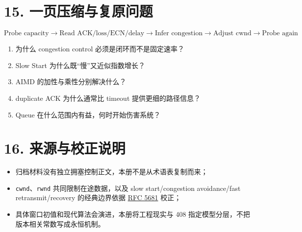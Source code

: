 \documentclass[UTF8,fontset=none,11pt,a4paper]{ctexart}
\providecommand{\tightlist}{\setlength{\itemsep}{0pt}\setlength{\parskip}{0pt}}
\providecommand{\passthrough}[1]{#1}
\begin{document}
\section{15.
一页压缩与复原问题}\label{15-ux4e00ux9875ux538bux7f29ux4e0eux590dux539fux95eeux9898}

\[
\boxed{
\text{Probe capacity}
\to \text{Read ACK/loss/ECN/delay}
\to \text{Infer congestion}
\to \text{Adjust cwnd}
\to \text{Probe again}
}
\]

\begin{enumerate}
\def\labelenumi{\arabic{enumi}.}
\tightlist
\item
  为什么 congestion control 必须是闭环而不是固定速率？
\item
  Slow Start 为什么既``慢''又近似指数增长？
\item
  AIMD 的加性与乘性分别解决什么？
\item
  duplicate ACK 为什么通常比 timeout 提供更细的路径信息？
\item
  Queue 在什么范围内有益，何时开始伤害系统？
\end{enumerate}

\section{16.
来源与校正说明}\label{16-ux6765ux6e90ux4e0eux6821ux6b63ux8bf4ux660e}

\begin{itemize}
\tightlist
\item
  归档材料没有独立拥塞控制正文，本册不是从术语表复制而来；
\item
  \passthrough{\lstinline!cwnd!}、\passthrough{\lstinline!rwnd!}
  共同限制在途数据，以及 slow start/congestion avoidance/fast
  retransmit/recovery 的经典边界依据
  \href{https://www.rfc-editor.org/rfc/rfc5681.html}{RFC 5681} 校正；
\item
  具体窗口初值和现代算法会演进，本册将工程现实与 408
  指定模型分层，不把版本相关常数写成永恒机制。
\end{itemize}
\end{document}
